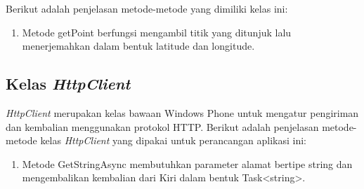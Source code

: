 Berikut adalah penjelasan metode-metode yang dimiliki kelas ini:
\begin{enumerate}
	\item Metode getPoint berfungsi mengambil titik yang ditunjuk lalu menerjemahkan dalam bentuk latitude dan longitude. 
\end{enumerate}

\subsection{Kelas \textit{HttpClient}}
\label{lab:Kelas HttpClient}
\hspace{0.5cm} \textit{HttpClient} merupakan kelas bawaan Windows Phone untuk mengatur pengiriman dan kembalian menggunakan protokol HTTP. Berikut adalah penjelasan metode-metode kelas \textit{HttpClient} yang dipakai untuk perancangan aplikasi ini:
\begin{enumerate}
	\item Metode GetStringAsync membutuhkan parameter alamat bertipe string dan mengembalikan kembalian dari Kiri dalam bentuk Task<string>.
\end{enumerate}

